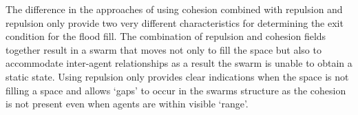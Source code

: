 The difference in the approaches of using cohesion combined with repulsion and repulsion only provide two very different characteristics for determining the exit condition for the flood fill. The combination of repulsion and cohesion fields together result in a swarm that moves not only to fill the space but also to accommodate inter-agent relationships as a result the swarm is unable to obtain a static state. Using repulsion only provides clear indications when the space is not filling a space and allows `gaps' to occur in the swarms structure as the cohesion is not present even when agents are within visible `range'.